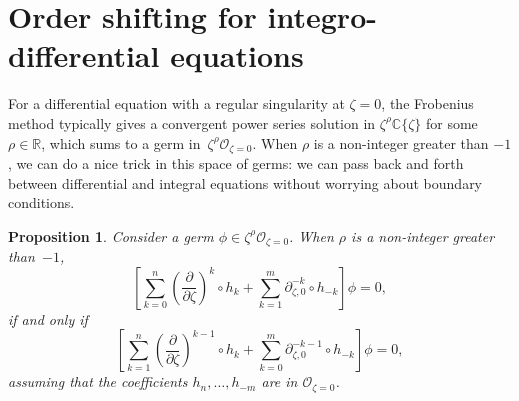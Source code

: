 \documentclass[pdftex]{sigma}
\newcommand{\R}{\mathbb{R}}
\newcommand{\C}{\mathbb{C}}
\newcommand{\fracderiv}[3]{\partial^{#1}_{#2, #3}}
\numberwithin{equation}{section}
\newtheorem{Proposition}[Theorem]{Proposition}
 { \theoremstyle{definition}
\newtheorem{Definition}[Theorem]{Definition}
\newtheorem{Remark}[Theorem]{Remark}
\newtheorem*{notation*}{Notation}
}
\begin{document}
\section{Order shifting for integro-differential equations}\label{shifting}
For a differential equation with a regular singularity at $\zeta = 0$, the Frobenius method typically gives a convergent power series solution in $\zeta^\rho \C\{\zeta\}$ for some $\rho \in \R$, which sums to a germ in~$\zeta^\rho \mathcal{O}_{\zeta=0}$. When $\rho$ is a non-integer greater than $-1$, we can do a nice trick in this space of germs: we can pass back and forth between differential and integral equations without worrying about boundary conditions.
\begin{Proposition}\label{prop:shifting}
Consider a germ $\phi \in \zeta^\rho \mathcal{O}_{\zeta=0}$. When $\rho$ is a non-integer greater than~$-1$,
\[ \left[ \sum_{k = 0}^n \left(\frac{\partial}{\partial \zeta}\right)^k \circ h_k + \sum_{k = 1}^m \fracderiv{-k}{\zeta}{0} \circ h_{-k} \right] \phi = 0, \]
if and only if
\[ \left[ \sum_{k = 1}^n \left(\frac{\partial}{\partial \zeta}\right)^{k-1} \circ h_k + \sum_{k = 0}^m \fracderiv{-k-1}{\zeta}{0} \circ h_{-k} \right] \phi = 0, \]
assuming that the coefficients $h_n, \dots, h_{-m}$ are in $\mathcal{O}_{\zeta=0}$.
\end{Proposition}
\end{document}
